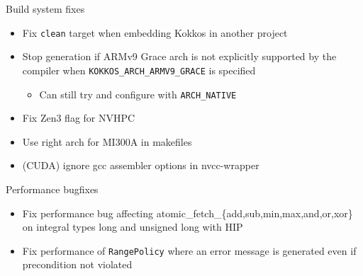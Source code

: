 \begin{frame}[fragile]{Build system fixes}
  \begin{itemize}
      \item Fix \texttt{clean} target when embedding Kokkos in another project
      \item Stop generation if ARMv9 Grace arch is not explicitly supported by the compiler when \texttt{KOKKOS\_ARCH\_ARMV9\_GRACE} is specified
      \begin{itemize}
        \item Can still try and configure with \texttt{ARCH\_NATIVE}
      \end{itemize}
      \item Fix Zen3 flag for NVHPC
      \item Use right arch for MI300A in makefiles
      \item (CUDA) ignore gcc assembler options in nvcc-wrapper
  \end{itemize}
 \end{frame}

\begin{frame}[fragile]{Performance bugfixes}
 \begin{itemize}
     \item Fix performance bug affecting atomic\_fetch\_\{add,sub,min,max,and,or,xor\} on integral types long and unsigned long with HIP
     \item Fix performance of \texttt{RangePolicy} where an error message is generated even if precondition not violated
 \end{itemize}
\end{frame}




